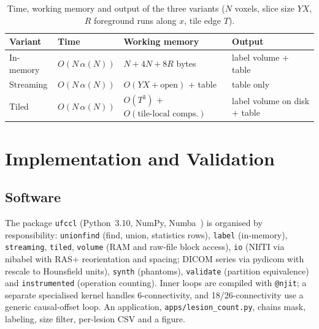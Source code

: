 \documentclass[11pt,a4paper]{article}
\newcommand{\hrow}{\rowcolor{sitlight}}
\newcommand{\ufccl}{\texttt{ufccl}}
\begin{document}
\begin{table}[!t]
\centering
\caption{Time, working memory and output of the three variants ($N$ voxels, slice size $YX$, $R$ foreground runs along $x$, tile edge $T$).}\label{tab:variants}
\small
\begin{tabular}{@{}lllp{4.6cm}@{}}
\toprule
\hrow Variant & Time & Working memory & Output\\
\midrule
In-memory & $O(N\,\alpha(N))$ & $N+4N+8R$ bytes & label volume + table\\
Streaming & $O(N\,\alpha(N))$ & $O(YX+\text{open})$ + table & table only\\
Tiled & $O(N\,\alpha(N))$ & $O(T^3)$ + $O(\text{tile-local comps.})$ & label volume on disk + table\\
\bottomrule
\end{tabular}
\end{table}

\section{Implementation and Validation}
\subsection{Software}
The package \ufccl{} (Python~3.10, NumPy, Numba~\cite{numba2015}) is organised by responsibility: \texttt{unionfind} (find, union, statistics rows), \texttt{label} (in-memory), \texttt{streaming}, \texttt{tiled}, \texttt{volume} (RAM and raw-file block access), \texttt{io} (NIfTI via nibabel with RAS+ reorientation and spacing; DICOM series via pydicom with rescale to Hounsfield units), \texttt{synth} (phantoms), \texttt{validate} (partition equivalence) and \texttt{instrumented} (operation counting). Inner loops are compiled with \texttt{@njit}; a separate specialised kernel handles 6-connectivity, and 18/26-connectivity use a generic causal-offset loop. An application, \texttt{apps/lesion\_count.py}, chains mask, labeling, size filter, per-lesion CSV and a figure.
\end{document}
